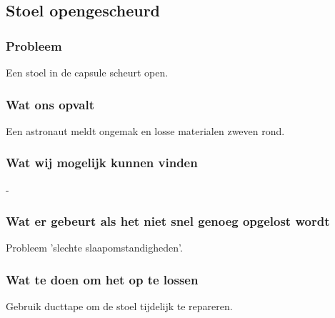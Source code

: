 \subsection{Stoel opengescheurd}

\subsubsection{Probleem}
Een stoel in de capsule scheurt open.

\subsubsection{Wat ons opvalt}
Een astronaut meldt ongemak en losse materialen zweven rond.

\subsubsection{Wat wij mogelijk kunnen vinden}
-

\subsubsection{Wat er gebeurt als het niet snel genoeg opgelost wordt}
Probleem 'slechte slaapomstandigheden'.

\subsubsection{Wat te doen om het op te lossen}
Gebruik ducttape om de stoel tijdelijk te repareren.